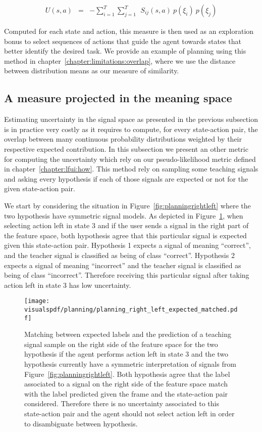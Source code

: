 \begin{eqnarray}
U(s,a) &=& - \sum_{i = 1}^{T} \sum_{j = 1}^{T} ~~ S_{ij}(s,a) ~ p(\xi_i) ~ p(\xi_j)
\end{eqnarray}

Computed for each state and action, this measure is then used as an exploration bonus to select sequences of actions that guide the agent towards states that better identify the desired task. We provide an example of planning using this method in chapter~\ref{chapter:limitations:overlap}, where we use the distance between distribution means as our measure of similarity.

\subsection{A measure projected in the meaning space}
\label{chapter:planning:uncertiantyprojected}

Estimating uncertainty in the signal space as presented in the previous subsection is in practice very costly as it requires to compute, for every state-action pair, the overlap between many continuous probability distributions weighted by their respective expected contribution. In this subsection we present an other metric for computing the uncertainty which rely on our pseudo-likelihood metric defined in chapter~\ref{chapter:lfui:how}. This method rely on sampling some teaching signals and asking every hypothesis if each of those signals are expected or not for the given state-action pair. 

We start by considering the situation in Figure~\ref{fig:planningrightleft} where the two hypothesis have symmetric signal models. As depicted in Figure~\ref{fig:uncertaintymeaningrightleftexpectedleft}, when selecting action left in state 3 and if the user sends a signal in the right part of the feature space, both hypothesis agree that this particular signal is expected given this state-action pair. Hypothesis 1 expects a signal of meaning ``correct'', and the teacher signal is classified as being of class ``correct''. Hypothesis 2 expects a signal of meaning ``incorrect'' and the teacher signal is classified as being of class ``incorrect''. Therefore receiving this particular signal after taking action left in state 3 has low uncertainty.

\begin{figure}[!htbp]
  \centering
  \texttt{[image: \\visualspdf/planning/planning\_right\_left\_expected\_matched.pdf]}
  \caption{Matching between expected labels and the prediction of a teaching signal sample on the right side of the feature space for the two hypothesis if the agent performs action left in state 3 and the two hypothesis currently have a symmetric interpretation of signals from Figure~\ref{fig:planningrightleft}. Both hypothesis agree that the label associated to a signal on the right side of the feature space match with the label predicted given the frame and the state-action pair considered. Therefore there is no uncertainty associated to this state-action pair and the agent should not select action left in order to disambiguate between hypothesis.}
  \label{fig:uncertaintymeaningrightleftexpectedleft}
\end{figure}

